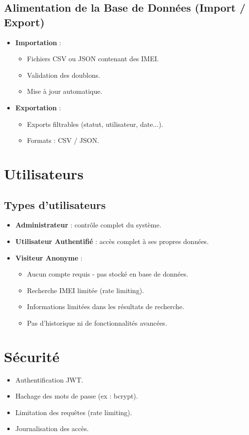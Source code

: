 \documentclass[a4paper,12pt]{article}
\begin{document}
\subsection{Alimentation de la Base de Données (Import / Export)}
\begin{itemize}
    \item \textbf{Importation} :
    \begin{itemize}
        \item Fichiers CSV ou JSON contenant des IMEI.
        \item Validation des doublons.
        \item Mise à jour automatique.
    \end{itemize}
    \item \textbf{Exportation} :
    \begin{itemize}
        \item Exports filtrables (statut, utilisateur, date...).
        \item Formats : CSV / JSON.
    \end{itemize}
\end{itemize}

\section{Utilisateurs}

\subsection{Types d'utilisateurs}
\begin{itemize}
    \item \textbf{Administrateur} : contrôle complet du système.
    \item \textbf{Utilisateur Authentifié} : accès complet à ses propres données.
    \item \textbf{Visiteur Anonyme} : 
    \begin{itemize}
        \item Aucun compte requis - pas stocké en base de données.
        \item Recherche IMEI limitée (rate limiting).
        \item Informations limitées dans les résultats de recherche.
        \item Pas d'historique ni de fonctionnalités avancées.
    \end{itemize}
\end{itemize}

\section{Sécurité}
\begin{itemize}
    \item Authentification JWT.
    \item Hachage des mots de passe (ex : bcrypt).
    \item Limitation des requêtes (rate limiting).
    \item Journalisation des accès.
\end{itemize}
\end{document}
